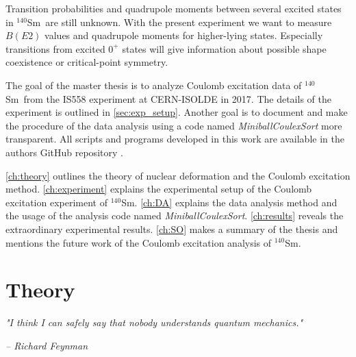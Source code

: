 \documentclass[twoside,english]{uiofysmaster/uiofysmaster}
\newcommand{\Sm}{$^{140}$Sm} %
\let\orgautoref\autoref
\renewcommand{\autoref}
        {%
		 \def\sectionautorefname{Section}%
		 \def\subsectionautorefname{Section}%
		 \def\subsubsectionautorefname{Section}%
		 \def\chapterautorefname{Chapter}%
          \orgautoref}
\begin{document}
Transition probabilities and quadrupole moments between several excited states in \Sm\ are still unknown.
With the present experiment we want to measure $B(E2)$ values and quadrupole moments for higher-lying states.
Especially transitions from excited $0^+$ states will give information about possible shape coexistence or critical-point symmetry. 

The goal of the master thesis is to analyze Coulomb excitation data of \Sm\ from the IS558 experiment at CERN-ISOLDE in 2017. 
The details of the experiment is outlined in \autoref{sec:exp_setup}. 
Another goal is to document and make the procedure of the data analysis using a code named \textsl{MiniballCoulexSort} more transparent.
All scripts and programs developed in this work are available in the authors GitHub repository \cite{GH-repo}.

\autoref{ch:theory} outlines the theory of nuclear deformation and the Coulomb excitation method. 
\autoref{ch:experiment} explains the experimental setup of the Coulomb excitation experiment of \Sm.
\autoref{ch:DA} explains the data analysis method and the usage of the analysis code named \textsl{MiniballCoulexSort}.
\autoref{ch:results} reveals the extraordinary experimental results.
\autoref{ch:SO} makes a summary of the thesis and mentions the future work of the Coulomb excitation analysis of \Sm.



\chapter{Theory}\label{ch:theory}
\epigraph{\textit{"I think I can safely say that nobody understands quantum mechanics."}}{\textit{– Richard Feynman}}
\end{document}
